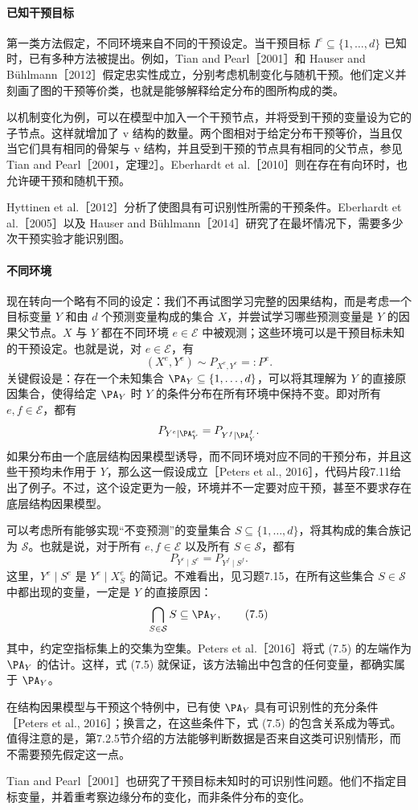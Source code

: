 \paragraph{已知干预目标}
第一类方法假定，不同环境来自不同的干预设定。当干预目标 $I^e\subseteq\{1,\ldots,d\}$ 已知时，已有多种方法被提出。例如，Tian and Pearl［2001］和 Hauser and Bühlmann［2012］假定忠实性成立，分别考虑机制变化与随机干预。他们定义并刻画了图的干预等价类，也就是能够解释给定分布的图所构成的类。

以机制变化为例，可以在模型中加入一个干预节点，并将受到干预的变量设为它的子节点。这样就增加了 v 结构的数量。两个图相对于给定分布干预等价，当且仅当它们具有相同的骨架与 v 结构，并且受到干预的节点具有相同的父节点，参见 Tian and Pearl［2001，定理2］。Eberhardt et al.［2010］则在存在有向环时，也允许硬干预和随机干预。

Hyttinen et al.［2012］分析了使图具有可识别性所需的干预条件。Eberhardt et al.［2005］以及 Hauser and Bühlmann［2014］研究了在最坏情况下，需要多少次干预实验才能识别图。

\paragraph{不同环境}
现在转向一个略有不同的设定：我们不再试图学习完整的因果结构，而是考虑一个目标变量 $Y$ 和由 $d$ 个预测变量构成的集合 $X$，并尝试学习哪些预测变量是 $Y$ 的因果父节点。$X$ 与 $Y$ 都在不同环境 $e\in\mathcal E$ 中被观测；这些环境可以是干预目标未知的干预设定。也就是说，对 $e\in\mathcal E$，有
\[
 (X^e,Y^e)\sim P_{X^e,Y^e}=:P^e.
\]
关键假设是：存在一个未知集合 $\PA_Y\subseteq\{1,\ldots,d\}$，可以将其理解为 $Y$ 的直接原因集合，使得给定 $\PA_Y$ 时 $Y$ 的条件分布在所有环境中保持不变。即对所有 $e,f\in\mathcal E$，都有
\[
 P_{Y^e\mid\PA_Y^e}=P_{Y^f\mid\PA_Y^f}.
\]
如果分布由一个底层结构因果模型诱导，而不同环境对应不同的干预分布，并且这些干预均未作用于 $Y$，那么这一假设成立［Peters et al., 2016］，代码片段7.11给出了例子。不过，这个设定更为一般，环境并不一定要对应干预，甚至不要求存在底层结构因果模型。

可以考虑所有能够实现“不变预测”的变量集合 $S\subseteq\{1,\ldots,d\}$，将其构成的集合族记为 $\mathcal S$。也就是说，对于所有 $e,f\in\mathcal E$ 以及所有 $S\in\mathcal S$，都有
\begin{equation}
 P_{Y^e\mid S^e}=P_{Y^f\mid S^f}.
 \tag{7.4}
\end{equation}
这里，$Y^e\mid S^e$ 是 $Y^e\mid X_S^e$ 的简记。不难看出，见习题7.15，在所有这些集合 $S\in\mathcal S$ 中都出现的变量，一定是 $Y$ 的直接原因：
\begin{equation}
 \bigcap_{S\in\mathcal S}S\subseteq\PA_Y,
 \tag{7.5}
\end{equation}
其中，约定空指标集上的交集为空集。Peters et al.［2016］将式 (7.5) 的左端作为 $\PA_Y$ 的估计。这样，式 (7.5) 就保证，该方法输出中包含的任何变量，都确实属于 $\PA_Y$。

在结构因果模型与干预这个特例中，已有使 $\PA_Y$ 具有可识别性的充分条件［Peters et al., 2016］；换言之，在这些条件下，式 (7.5) 的包含关系成为等式。值得注意的是，第7.2.5节介绍的方法能够判断数据是否来自这类可识别情形，而不需要预先假定这一点。

Tian and Pearl［2001］也研究了干预目标未知时的可识别性问题。他们不指定目标变量，并着重考察边缘分布的变化，而非条件分布的变化。
